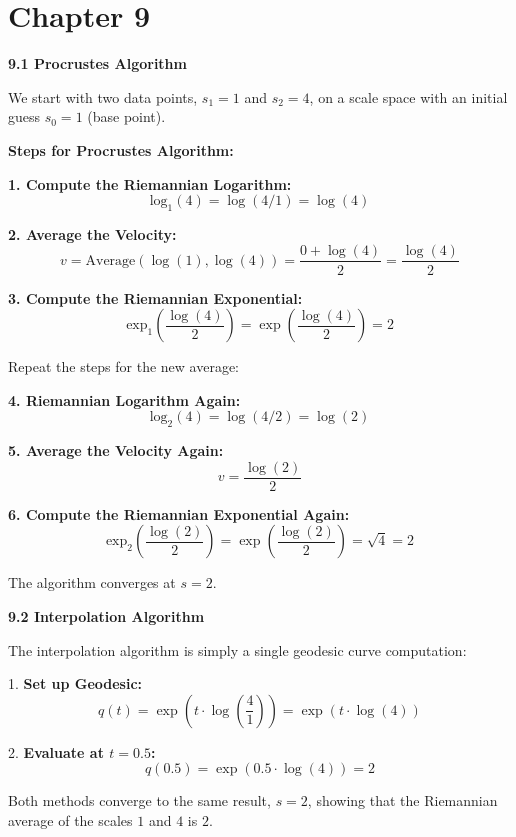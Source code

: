 \documentclass{article}
\begin{document}
\newpage
\section{Chapter 9}

\textbf{9.1 Procrustes Algorithm}

We start with two data points, \( s_1 = 1 \) and \( s_2 = 4 \), on a scale space with an initial guess \( s_0 = 1 \) (base point).

\textbf{Steps for Procrustes Algorithm:}

\textbf{1. Compute the Riemannian Logarithm:}
   \[
   \text{log}_1(4) = \log(4/1) = \log(4)
   \]

\textbf{2. Average the Velocity:}
   \[
   v = \text{Average}(\log(1), \log(4)) = \frac{0 + \log(4)}{2} = \frac{\log(4)}{2}
   \]

\textbf{3. Compute the Riemannian Exponential:}
   \[
   \text{exp}_1\left(\frac{\log(4)}{2}\right) = \exp\left(\frac{\log(4)}{2}\right) = 2
   \]

   Repeat the steps for the new average:

\textbf{4. Riemannian Logarithm Again:}
   \[
   \text{log}_2(4) = \log(4/2) = \log(2)
   \]

\textbf{5. Average the Velocity Again:}
   \[
   v = \frac{\log(2)}{2}
   \]

\textbf{6. Compute the Riemannian Exponential Again:}
   \[
   \text{exp}_2\left(\frac{\log(2)}{2}\right) = \exp\left(\frac{\log(2)}{2}\right) = \sqrt{4} = 2
   \]

The algorithm converges at \( s = 2 \).

\textbf{9.2 Interpolation Algorithm}

The interpolation algorithm is simply a single geodesic curve computation:

1. \textbf{Set up Geodesic:}
   \[
   q(t) = \exp\left(t \cdot \log\left(\frac{4}{1}\right)\right) = \exp(t \cdot \log(4))
   \]

2. \textbf{Evaluate at \( t = 0.5 \):}
   \[
   q(0.5) = \exp(0.5 \cdot \log(4)) = 2
   \]

Both methods converge to the same result, \( s = 2 \), showing that the Riemannian average of the scales \( 1 \) and \( 4 \) is \( 2 \).
\end{document}
